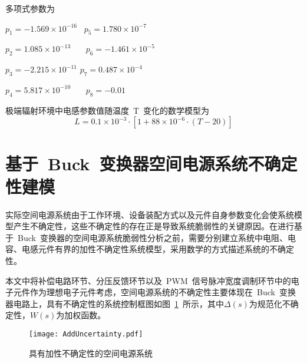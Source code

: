 多项式参数为

\qquad \qquad $p_1=-1.569\times 10^{-16}$     \qquad \qquad ~$p_5= 1.780\times 10^{-7} $

\qquad \qquad  $p_2= 1.085\times 10^{-13}$    \qquad \qquad ~~~$p_6=-1.461\times 10^{-5}$

\qquad \qquad $p_3=-2.215\times 10^{-11}$     \qquad \qquad $p_7= 0.487\times 10^{-4}$

\qquad \qquad $p_4= 5.817\times 10^{-10}$     \qquad \qquad ~~~$ p_8=-0.01$
\iffalse
\begin{table}[htbp]
  \centering
\begin{tabular}{p{5cm}p{5cm}}

  $p_1=-1.569\times 10^{-16}$     & $p_5= 1.780\times 10^{-7} $\\

  $p_2= 1.085\times 10^{-13}$     & $p_6=-1.461\times 10^{-5}$ \\

  $p_3=-2.215\times 10^{-11}$     & $p_7= 0.487\times 10^{-4}$ \\

 $p_4= 5.817\times 10^{-10}$      & $ p_8=-0.01$ \\

\end{tabular}
\end{table}
\fi

极端辐射环境中电感参数值随温度~T~变化的数学模型为
\begin{equation}\label{equ:chap5:Index10}
  L=0.1\times 10^{-3}\cdot\left[1+88\times 10^{-6}\cdot\left(T-20\right)\right]
\end{equation}

\section{基于~Buck~变换器空间电源系统不确定性建模}
\label{sub:chap5:compare}
实际空间电源系统由于工作环境、设备装配方式以及元件自身参数变化会使系统模型产生不确定性，这些不确定性的存在正是导致系统脆弱性的关键原因。在进行基于~Buck~变换器的空间电源系统脆弱性分析之前，需要分别建立系统中电阻、电容、电感元件有界的加性不确定性系统模型，采用数学的方式描述系统的不确定性。

本文中将补偿电路环节、分压反馈环节以及~PWM~信号脉冲宽度调制环节中的电子元件作为理想电子元件考虑，空间电源系统的不确定性主要体现在~Buck~变换器电路上，具有不确定性的系统控制框图如图~\ref{fig:chap5:adduncertainty}~所示，其中$\Delta\left(s\right)$为规范化不确定性，$W\left(s\right)$为加权函数。
\begin{figure}[h]
  \centering
     \texttt{[image: AddUncertainty.pdf]}\\
  \caption{具有加性不确定性的空间电源系统}\label{fig:chap5:adduncertainty}
\end{figure}

